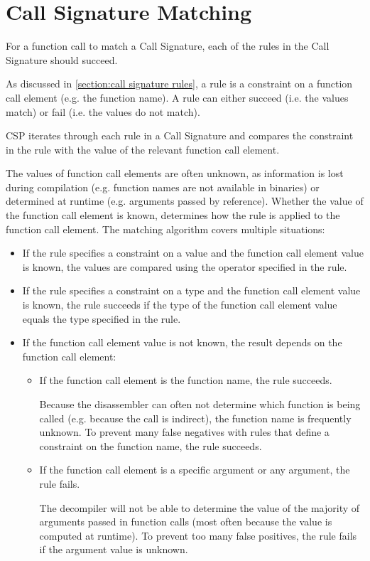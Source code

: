 \section{Call Signature Matching}\label{section:matching function call call signatures}
For a function call to match a Call Signature, each of the rules in the Call Signature should succeed.

As discussed in \autoref{section:call signature rules}, a rule is a constraint on a function call element (e.g. the function name). A rule can either succeed (i.e. the values match) or fail (i.e. the values do not match).

CSP iterates through each rule in a Call Signature and compares the constraint in the rule with the value of the relevant function call element.

The values of function call elements are often unknown, as information is lost during compilation (e.g. function names are not available in binaries) or determined at runtime (e.g. arguments passed by reference). Whether the value of the function call element is known, determines how the rule is applied to the function call element. The matching algorithm covers multiple situations:
\begin{itemize}
    \item If the rule specifies a constraint on a value and the function call element value is known, the values are compared using the operator specified in the rule.

    \item If the rule specifies a constraint on a type and the function call element value is known, the rule succeeds if the type of the function call element value equals the type specified in the rule.

    \item If the function call element value is not known, the result depends on the function call element:

    \begin{itemize}
        \item If the function call element is the function name, the rule succeeds.

        Because the disassembler can often not determine which function is being called (e.g. because the call is indirect), the function name is frequently unknown. To prevent many false negatives with rules that define a constraint on the function name, the rule succeeds.

        \item If the function call element is a specific argument or any argument, the rule fails.

        The decompiler will not be able to determine the value of the majority of arguments passed in function calls (most often because the value is computed at runtime). To prevent too many false positives, the rule fails if the argument value is unknown.
    \end{itemize}
\end{itemize}

